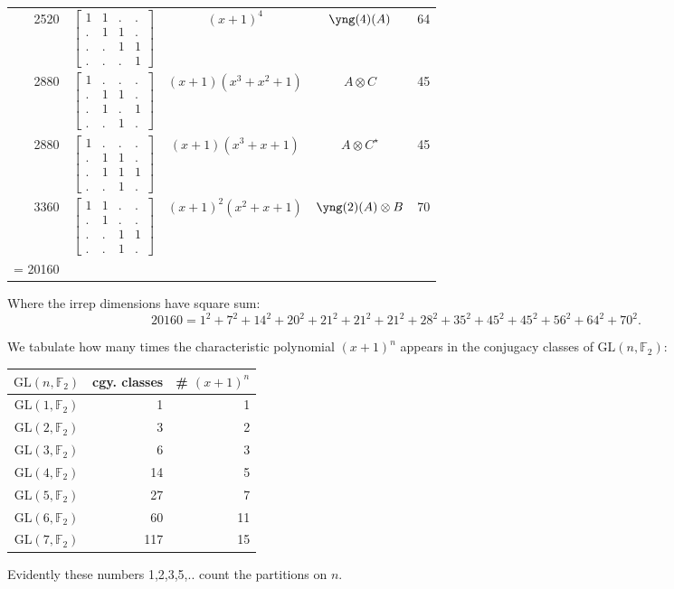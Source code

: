\documentclass[11pt,oneside]{article}
\newcommand{\GL}{\mathrm{GL}}
\newcommand{\Field}{\mathbb{F}}
\newcommand{\tensor}{\otimes}
\begin{document}
\begin{center}
\begin{tabular}{r|l|c|c|c}
2520  & $\begin{bmatrix}1&1&.&.\\.&1&1&.\\.&.&1&1\\.&.&.&1\end{bmatrix}$  & $(x+1)^4$  & $\yng(4)(A)$ & 64   \\
2880  & $\begin{bmatrix}1&.&.&.\\.&1&1&.\\.&1&.&1\\.&.&1&.\end{bmatrix}$
  & $(x+1)(x^3+x^2+1)$  & $A\tensor C$ & 45   \\
2880  & $\begin{bmatrix}1&.&.&.\\.&1&1&.\\.&1&1&1\\.&.&1&.\end{bmatrix}$
  & $(x+1)(x^3+x+1)$  & $A\tensor C^{\star}$ & 45   \\
3360  & $\begin{bmatrix}1&1&.&.\\.&1&.&.\\.&.&1&1\\.&.&1&.\end{bmatrix}$  & $(x+1)^2(x^2+x+1)$  & $\yng(2)(A)\tensor B$ & 70 \\
\hline
\strut = 20160 \\
\end{tabular}
\end{center}

Where the irrep dimensions have square sum:
$$
 20160 = 1^2 + 7^2 + 14^2 + 20^2 + 21^2 + 21^2 + 21^2 + 28^2 + 35^2 + 45^2 + 45^2 + 56^2 + 64^2 + 70^2.
$$

We tabulate how many times the characteristic polynomial $(x+1)^n$ appears
in the conjugacy classes of $\GL(n,\Field_2)$:
\begin{center}\begin{tabular}{c|r|r}
$\GL(n,\Field_2)$ & cgy. classes  & \# $(x+1)^n$ \\
\hline
$\GL(1,\Field_2)$  & 1    & 1 \\
$\GL(2,\Field_2)$  & 3    & 2 \\
$\GL(3,\Field_2)$  & 6   & 3 \\
$\GL(4,\Field_2)$  & 14   & 5 \\
$\GL(5,\Field_2)$  & 27   & 7 \\
$\GL(6,\Field_2)$  & 60   & 11 \\
$\GL(7,\Field_2)$  & 117   & 15 \\
\end{tabular} \end{center}
Evidently these numbers 1,2,3,5,.. count the partitions on $n$.
\end{document}
